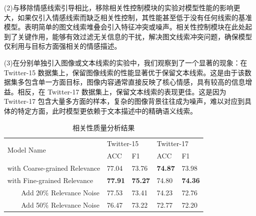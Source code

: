 (2)与移除情感线索引导相比，移除相关性控制模块的实验对模型性能的影响更大，如果仅引入情感线索而缺乏相关性控制，其性能甚至低于没有任何线索的基准模型。表明简单的图文线索堆叠会引入特征冲突或噪声。相关性控制模块在此处起到了关键作用，能够有效过滤无关信息的干扰，解决图文线索冲突问题，确保模型仅利用与目标方面强相关的情感描述。

(3)在分别单独引入图像或文本线索的实验中，我们观察到了一个显著的现象：在 Twitter-15 数据集上，保留图像线索的性能显著优于保留文本线索。这是由于该数据集多包含单一方面目标，图像内容通常直接反映了核心情感，具有较高的信息增益。相反，在 Twitter-17 数据集上，保留文本线索的表现更佳。这是因为 Twitter-17 包含大量多方面的样本，复杂的图像背景往往成为噪声，难以对应到具体的特定方面，此时模型更依赖于文本描述中的精确语义线索。






\begin{table}[htbp]
  \centering
    \caption{相关性质量分析结果}
    \label{second:relevanceQuality}
\begin{tabular}{lllll}
\toprule
\multirow{2}{*}{Model Name} & \multicolumn{2}{l}{Twitter-15} & \multicolumn{2}{l}{Twitter-17} \\
                            & ACC            & F1             & ACC             & F1            \\
    \hline
with Coarse-grained Relevance            & 77.04          & 73.76          & \textbf{74.87}                        & 73.98                        \\
with Fine-grained Relevance            & \textbf{77.91}          & \textbf{75.27}          & 74.80 & \textbf{74.36} \\
~~~~Add 20\% Relevance Noise        & 77.53          & 73.41          & 74.23                        & 72.76                        \\
~~~~Add 50\% Relevance Noise        & 76.47          & 73.22          & 72.77                        & 72.20    \\    
\bottomrule
\end{tabular}
\end{table}

